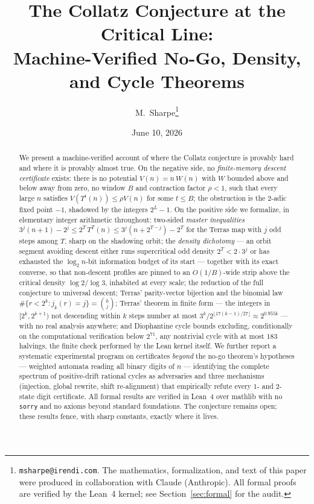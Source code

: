 \documentclass[11pt]{article}
\title{The Collatz Conjecture at the Critical Line:\\
       Machine-Verified No-Go, Density, and Cycle Theorems}
\author{M.~Sharpe\thanks{\texttt{msharpe@irendi.com}. The mathematics,
  formalization, and text of this paper were produced in collaboration
  with Claude (Anthropic). All formal proofs are verified by the Lean~4
  kernel; see Section~\ref{sec:formal} for the audit.}}
\date{June 10, 2026}
\newcommand{\code}[1]{\texttt{#1}}
\begin{document}
\maketitle

\begin{abstract}
We present a machine-verified account of where the Collatz conjecture
is provably hard and where it is provably almost true. On the negative
side, no \emph{finite-memory descent certificate} exists: there is no
potential $V(n)=n\,W(n)$ with $W$ bounded above and below away from
zero, no window $B$ and contraction factor $\rho<1$, such that every
large $n$ satisfies $V(T^t(n))\le\rho V(n)$ for some $t\le B$; the
obstruction is the $2$-adic fixed point $-1$, shadowed by the integers
$2^L-1$. On the positive side we formalize, in elementary integer
arithmetic throughout: two-sided \emph{master inequalities}
$3^j(n+1)-2^j \le 2^T\,T^T(n) \le 3^j(n+2^{T-j})-2^T$ for the Terras
map with $j$ odd steps among $T$, sharp on the shadowing orbit; the
\emph{density dichotomy} --- an orbit segment avoiding descent either
runs supercritical odd density $2^T<2\cdot 3^j$ or has exhausted the
$\log_2 n$-bit information budget of its start --- together with its
exact converse, so that non-descent profiles are pinned to an
$O(1/B)$-wide strip above the critical density $\log 2/\log 3$,
inhabited at every scale; the reduction of the full conjecture to
universal descent; Terras' parity-vector bijection and the binomial law
$\#\{r<2^k : j_k(r)=j\}=\binom{k}{j}$; Terras' theorem in finite form
--- the integers in $[2^k,2^{k+1})$ not descending within $k$ steps
number at most $3^k/2^{\lfloor 17(k-1)/27\rfloor}\approx 2^{0.955k}$
--- with no real analysis anywhere; and Diophantine cycle bounds
excluding, conditionally on the computational verification below
$2^{71}$, any nontrivial cycle with at most $183$ halvings, the finite
check performed by the Lean kernel itself. We further report a
systematic experimental program on certificates \emph{beyond} the no-go
theorem's hypotheses --- weighted automata reading all binary digits of
$n$ --- identifying the complete spectrum of positive-drift rational
cycles as adversaries and three mechanisms (injection, global rewrite,
shift re-alignment) that empirically refute every $1$- and $2$-state
digit certificate. All formal results are verified in Lean~4 over
\textsf{mathlib} with no \code{sorry} and no axioms beyond standard
foundations. The conjecture remains open; these results fence, with
sharp constants, exactly where it lives.
\end{abstract}
\end{document}
